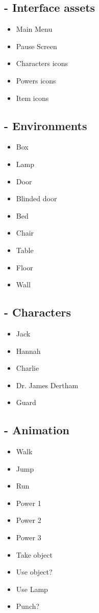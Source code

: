 \subsection{- Interface assets}
\begin{itemize}  
\item Main Menu
\item Pause Screen
\item Characters icons
\item Powers icons
\item Item icons
\end{itemize}

\subsection{- Environments}
\begin{itemize}  
\item Box
\item Lamp
\item Door
\item Blinded door
\item Bed
\item Chair
\item Table
\item Floor
\item Wall
\end{itemize}
        
\subsection{- Characters}
\begin{itemize}  
\item Jack
\item Hannah
\item Charlie
\item Dr. James Dertham
\item Guard
\end{itemize}

\subsection{- Animation}
\begin{itemize}  
\item Walk
\item Jump
\item Run
\item Power 1
\item Power 2
\item Power 3
\item Take object
\item Use object?
\item Use Lamp
\item Punch?
\end{itemize}

